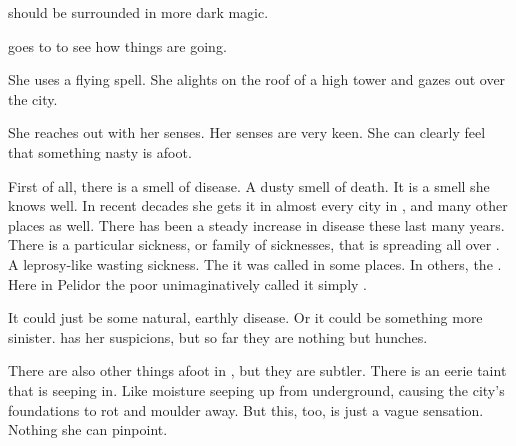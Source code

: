 
\begin{comment}
  \section{\Criseis smells the city}
\end{comment}
\Criseis should be surrounded in more dark magic.

\Criseis{} goes to \Malcur to see how things are going. 

She uses a flying spell.
She alights on the roof of a high tower and gazes out over the city. 

She reaches out with her senses. 
Her senses are very keen. 
She can clearly feel that something nasty is afoot. 

First of all, there is a smell of disease.
A dusty smell of death.  
It is a smell she knows well. 
In recent decades she gets it in almost every city in \Velcad, and many other places as well. 
There has been a steady increase in disease these last many years. 
There is a particular sickness, or family of sicknesses, that is spreading all over \Azmith. 
A leprosy-like wasting sickness. 
The  it was called in some places. 
In others, the . 
Here in Pelidor the poor unimaginatively called it simply . 

It could just be some natural, earthly disease. 
Or it could be something more sinister. 
\Criseis has her suspicions, but so far they are nothing but hunches. 

There are also other things afoot in \Malcur, but they are subtler. 
There is an eerie taint that is seeping in. 
Like moisture seeping up from underground, causing the city's foundations to rot and moulder away. 
But this, too, is just a vague sensation. 
Nothing she can pinpoint. 


